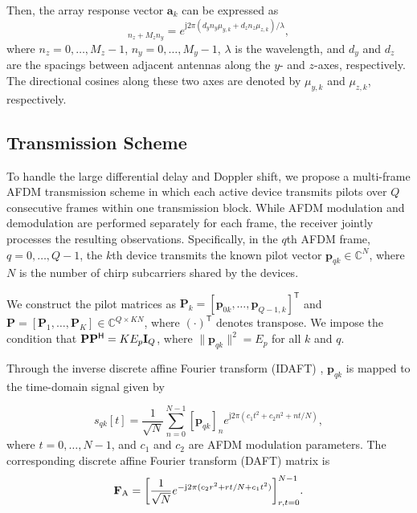 Then, the array response vector $\mathbf a_k$ can be expressed as
\begin{equation}
 [\mathbf a_k]_{n_z+M_zn_y}
 =e^{\mathrm j2\pi(d_yn_y\mu_{y,k}+d_zn_z\mu_{z,k})/\lambda},
 \label{eq:upa}
\end{equation}
where $n_z=0,\ldots,M_z-1$, $n_y=0,\ldots,M_y-1$,
$\lambda$ is the wavelength, and $d_y$ and $d_z$ are the spacings between
adjacent antennas along the $y$- and $z$-axes, respectively. The
directional cosines along these two axes are denoted by $\mu_{y,k}$ and
$\mu_{z,k}$, respectively.

\subsection{Transmission Scheme}
\label{sec:transmission-scheme}

To handle the large differential delay and Doppler shift, we propose a
multi-frame AFDM transmission scheme in which each active device
transmits pilots over $Q$ consecutive frames within one transmission
block. While AFDM modulation and demodulation are performed separately
for each frame, the receiver jointly processes the resulting observations.
Specifically, in the $q$th AFDM frame, $q=0,\ldots,Q-1$, the $k$th
device transmits the known pilot vector $\mathbf p_{qk}\in\mathbb C^N$,
where $N$ is the number of chirp subcarriers shared by the devices.

We construct the pilot matrices as
$\mathbf P_k=[\mathbf p_{0k},\ldots,\mathbf p_{Q-1,k}]^{\mathsf T}$
and $\mathbf P=[\mathbf P_1,\ldots,\mathbf P_K]\in\mathbb C^{Q\times KN}$,
where $(\cdot)^{\mathsf T}$ denotes transpose.
We impose the condition that
$\mathbf P\mathbf P^{\mathsf H}=KE_p\mathbf{I}_Q$, where
$\|\mathbf p_{qk}\|^2=E_p$ for all $k$ and $q$.

Through the inverse discrete affine Fourier transform (IDAFT)
\cite{bemani2022}, $\mathbf p_{qk}$ is mapped to the time-domain signal
given by

\begin{equation}
 s_{qk}[t]=\frac{1}{\sqrt N}\sum_{n=0}^{N-1}
 [\mathbf p_{qk}]_ne^{\mathrm j2\pi(c_1t^2+c_2n^2+nt/N)},
 \label{eq:afdm-time-signal}
\end{equation}
where $t=0,\ldots,N-1$, and $c_1$ and $c_2$ are AFDM modulation
parameters.
The corresponding discrete affine Fourier transform (DAFT) matrix is
\begin{equation}
 \begin{gathered}
 \mathbf F_{\rm A}
 =\left[\frac{1}{\sqrt N}e^{-\mathrm j2\pi(c_2r^2+rt/N+c_1t^2)}
 \right]_{r,t=0}^{N-1}
 \end{gathered}.
 \label{eq:daft}
\end{equation}

